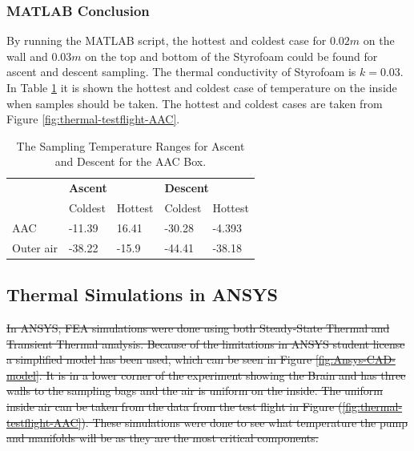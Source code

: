 \documentclass[a4paper,12pt,oneside]{article}
\providecommand{\DIFdeltex}[1]{{\protect\color{red}\sout{#1}}}                      %
\providecommand{\DIFdelbegin}{} %
\providecommand{\DIFdel}[1]{\texorpdfstring{\DIFdeltex{#1}}{}} %
\newcommand{\DIFscaledelfig}{0.5}
\newlength{\DIFdelgraphicswidth} %
\newlength{\DIFdelgraphicsheight} %
\newcommand{\DIFdelincludegraphics}[2][]{%
\sbox{\DIFdelgraphicsbox}{\DIFOincludegraphics[#1]{#2}}%
\settoboxwidth{\DIFdelgraphicswidth}{\DIFdelgraphicsbox} %
\settoboxtotalheight{\DIFdelgraphicsheight}{\DIFdelgraphicsbox} %
\scalebox{\DIFscaledelfig}{%
\parbox[b]{\DIFdelgraphicswidth}{\usebox{\DIFdelgraphicsbox}\\[-\baselineskip] \rule{\DIFdelgraphicswidth}{0em}}\llap{\resizebox{\DIFdelgraphicswidth}{\DIFdelgraphicsheight}{%
\setlength{\unitlength}{\DIFdelgraphicswidth}%
\begin{picture}(1,1)%
\thicklines\linethickness{2pt} %
{\color[rgb]{1,0,0}\put(0,0){\framebox(1,1){}}}%
{\color[rgb]{1,0,0}\put(0,0){\line( 1,1){1}}}%
{\color[rgb]{1,0,0}\put(0,1){\line(1,-1){1}}}%
\end{picture}%
}\hspace*{3pt}}} %
} %
\DeclareRobustCommand{\DIFdelbegin}{\DIFOdelbegin \let\includegraphics\DIFdelincludegraphics} %
\begin{document}
\begin{appendices}
\subsubsection{MATLAB Conclusion}
By running the MATLAB script, the hottest and coldest case for $0.02 m$ on the wall and $0.03 m$ on the top and bottom of the Styrofoam could be found for ascent and descent sampling. The thermal conductivity of Styrofoam is $k=0.03$. In Table \ref{tab:temperature-sampling-ascent-descent} it is shown the hottest and coldest case of temperature on the inside when samples should be taken. The hottest and coldest cases are taken from Figure \ref{fig:thermal-testflight-AAC}.


\begin{table}[H]
\centering
\begin{tabular}{l|l|l|l|l|}
\cline{2-5}
\multirow{2}{*}{}               & \multicolumn{2}{l|}{\textbf{Ascent}} & \multicolumn{2}{l|}{\textbf{Descent}} \\ \cline{2-5} 
                                & Coldest      & Hottest      & Coldest       & Hottest      \\ \hline
\multicolumn{1}{|l|}{AAC}       & -11.39       & 16.41        & -30.28        & -4.393       \\ \hline
\multicolumn{1}{|l|}{Outer air} & -38.22       & -15.9        & -44.41        & -38.18       \\ \hline
\end{tabular}
\caption{The Sampling Temperature Ranges for Ascent and Descent for the AAC Box.}
\label{tab:temperature-sampling-ascent-descent}
\end{table}


\subsection{Thermal Simulations in ANSYS}
\DIFdelbegin \DIFdel{In ANSYS, FEA simulations were done using both Steady-State Thermal and Transient Thermal analysis.
Because of the limitations in ANSYS student license a simplified model has been used, which can be seen in Figure \ref{fig:Ansys-CAD-model}. It is in a lower corner of the experiment showing the Brain and has three walls to the sampling bags and the air is uniform on the inside. The uniform inside air can be taken from the data from the test flight in Figure (\ref{fig:thermal-testflight-AAC}). These simulations were done to see what temperature the pump and manifolds will be as they are the most critical components.
}%


\end{appendices}
\end{document}
